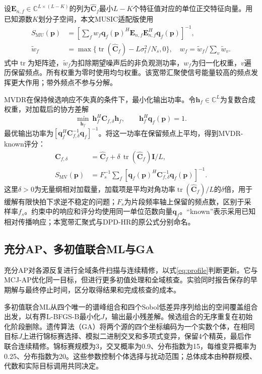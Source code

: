 \documentclass[a4paper,fleqn]{cas-sc}
\numberwithin{equation}{section}
\numberwithin{figure}{section}
\numberwithin{table}{section}
\newcommand{\C}{\mathbb C}
\newcommand{\tr}{\operatorname{tr}}
\begin{document}
设$\bm E_{n,f}\in\C^{L\times(L-K)}$的列为$\widehat{\bm C}_f$最小$L-K$个特征值对应的单位正交特征向量。用已知源数$K$划分子空间，本文MUSIC适配版使用
\begin{align}
 S_{\mathrm{MU}}(\bm p)&=\left[\sum_f w_f
 \bm q_f(\bm p)^H\bm E_{n,f}\bm E_{n,f}^H\bm q_f(\bm p)\right]^{-1},\label{eq:music}\\
 \widetilde w_f&=\max\{\tr(\widehat{\bm C}_f)-L\sigma_t^2/N_s,0\},\quad
 w_f=\widetilde w_f/\sum_v\widetilde w_v .\nonumber
\end{align}
式中$\tr$为矩阵迹，$\widetilde w_f$为扣除期望噪声后的非负观测功率，$w_f$为归一化权重，$v$遍历保留频点。所有权重为零时使用均匀权重。该宽带汇聚使信号能量较高的频点发挥更大作用；带外频点不参与分解。

MVDR在保持候选响应不失真的条件下，最小化输出功率\cite{Capon1969}。令$\bm h_f\in\C^L$为复数合成权重，对加载后的协方差解
\begin{equation}
 \min_{\bm h_f}\ \bm h_f^H\bm C_{f,\delta}\bm h_f,
 \qquad \bm h_f^H\bm q_f(\bm p)=1.\label{eq:mvdrConstraint}
\end{equation}
最优输出功率为$[\bm q_f^H\bm C_{f,\delta}^{-1}\bm q_f]^{-1}$。将这一功率在保留频点上平均，得到MVDR-known评分：
\begin{align}
 \bm C_{f,\delta}&=\widehat{\bm C}_f+
 \delta\,\tr(\widehat{\bm C}_f)\bm I/L,\nonumber\\
 S_{\mathrm{MV}}(\bm p)&=F_s^{-1}\sum_f
 [\bm q_f(\bm p)^H\bm C_{f,\delta}^{-1}\bm q_f(\bm p)]^{-1} .\label{eq:mvdr}
\end{align}
这里$\delta>0$为无量纲相对加载量，加载项是平均对角功率$\tr(\widehat{\bm C}_f)/L$的$\delta$倍，用于缓解有限快拍下求逆不稳定的问题；$F_s$为片段频率轴上保留的频点数，区别于采样率$f_s$。约束中的响应和评分均使用同一单位范数向量$\bm q_f$。“known”表示采用已知相对传播响应；本宽带汇聚式与DPD-HR的原公式分别命名\cite{TirerWeiss2016}。

\subsection{充分AP、多初值联合ML与GA}
充分AP对各源反复进行全域条件扫描与连续精修，以式\eqref{eq:profile}判断更新\cite{ChenHudsonYao2002}。它与MCJ-AP优化同一目标，但进行更多初值处理和全域核查。实验同时报告保存的早期解与最终停止时间，区分取得结果和完成核查的成本。

多初值联合ML从四个唯一的谱峰组合和四个Sobol低差异序列给出的空间覆盖组合出发，以有界L-BFGS-B最小化$J$，输出最小残差解。候选组合的无序重复在初始化阶段删除。遗传算法（GA）将两个源的四个坐标编码为一个实数个体，在相同目标$J$上进行锦标赛选择、模拟二进制交叉和多项式变异\cite{DebAgrawal1995}，保留4个精英，最后作联合连续精修。锦标赛规模为3，交叉概率为0.9、分布指数为15，每维变异概率为0.25、分布指数为20。这些参数控制个体选择与扰动范围；总体成本由种群规模、代数和实际目标调用共同决定。
\end{document}
